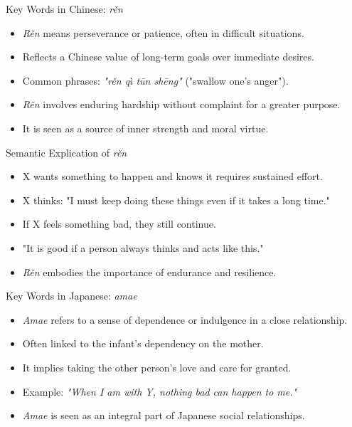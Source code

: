 \documentclass{beamer}
\begin{document}
\begin{frame}{Key Words in Chinese: \textit{rěn}}
    \begin{itemize}
        \item \textit{Rěn} means perseverance or patience, often in difficult situations.
        \item Reflects a Chinese value of long-term goals over immediate desires.
        \item Common phrases: \textit{"rěn qı̀ tūn shēng"} ("swallow one’s anger").
        \item \textit{Rěn} involves enduring hardship without complaint for a greater purpose.
        \item It is seen as a source of inner strength and moral virtue.
    \end{itemize}
\end{frame}

\begin{frame}{Semantic Explication of \textit{rěn}}
    \begin{itemize}
        \item X wants something to happen and knows it requires sustained effort.
        \item X thinks: "I must keep doing these things even if it takes a long time."
        \item If X feels something bad, they still continue.
        \item "It is good if a person always thinks and acts like this."
        \item \textit{Rěn} embodies the importance of endurance and resilience.
    \end{itemize}
\end{frame}

\begin{frame}{Key Words in Japanese: \textit{amae}}
    \begin{itemize}
        \item \textit{Amae} refers to a sense of dependence or indulgence in a close relationship.
        \item Often linked to the infant’s dependency on the mother.
        \item It implies taking the other person’s love and care for granted.
        \item Example: \textit{"When I am with Y, nothing bad can happen to me."}
        \item \textit{Amae} is seen as an integral part of Japanese social relationships.
    \end{itemize}
\end{frame}
\end{document}
